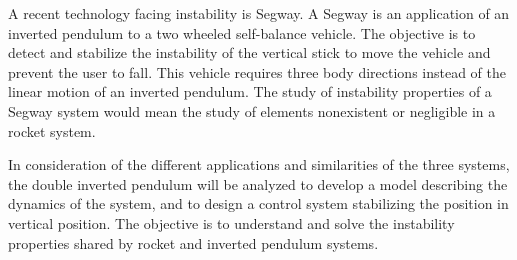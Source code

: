 A recent technology facing instability is Segway. A Segway is an application of an inverted pendulum to a two wheeled self-balance vehicle. The objective is to detect and stabilize the instability of the vertical stick to move the vehicle and prevent the user to fall. This vehicle requires three body directions instead of the linear motion of an inverted pendulum. The study of instability properties of a Segway system would mean the study of elements nonexistent or negligible in a rocket system.

In consideration of the different applications and similarities of the three systems, the double inverted pendulum will be analyzed to develop a model describing the dynamics of the system, and to design a control system stabilizing the position in vertical position. The objective is to understand and solve the instability properties shared by rocket and inverted pendulum systems.

